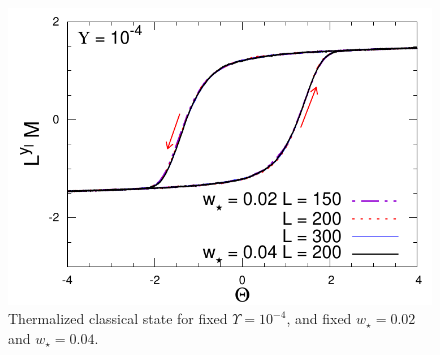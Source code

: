 \begin{frame}
\begin{columns}
\begin{column}{0.5\textwidth}
	\begin{figure}[!htb]
    		\includegraphics[width=1.\columnwidth]{paper/isC2Dw002Y104.pdf}
  		\caption{ Thermalized classical state for
    		fixed $\Upsilon=10^{-4}$, and fixed $w_\star = 0.02$ and $w_\star
    		= 0.04$. $\qquad \qquad \qquad \qquad \qquad \qquad \qquad \qquad$}
  		\label{roundtripMW}
	\end{figure}
	\end{column}
	\end{columns}
	
\end{frame}




